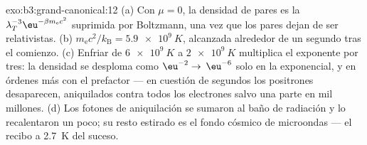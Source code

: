 \begin{solution}{exo:b3:grand-canonical:12}
(a) Con $\mu = 0$, la densidad de pares es la
$\lambda_T^{-3}\eu^{-\beta m_{\text{e}}c^2}$ suprimida por Boltzmann, una vez
que los pares dejan de ser relativistas. (b) $m_{\text{e}}c^2/k_{\text{B}} =
\qty{5.9e9}{K}$, alcanzada alrededor de un segundo tras el comienzo.
(c) Enfriar de $\qty{6e9}{K}$ a $\qty{2e9}{K}$ multiplica el
exponente por tres: la densidad se desploma como $\eu^{-2} \to$
$\eu^{-6}$ solo en la exponencial, y en órdenes más con el
prefactor --- en cuestión de segundos los positrones desaparecen,
aniquilados contra todos los electrones salvo una parte en mil millones.
(d) Los fotones de aniquilación se sumaron al baño de radiación y lo
recalentaron un poco; su resto estirado es el fondo cósmico de microondas
--- el recibo a \qty{2.7}{K} del suceso.
\end{solution}

